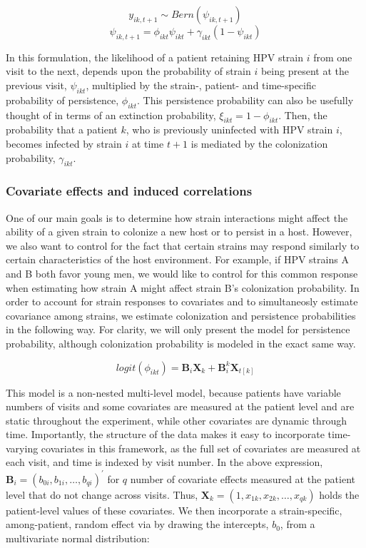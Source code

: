 \documentclass{article}
\begin{document}
$$y_{ik,t+1} \sim Bern(\psi_{ik,t+1})$$
$$\psi_{ik,t+1} = \phi_{ikt}\psi_{ikt} + \gamma_{ikt}(1-\psi_{ikt})$$

In this formulation, the likelihood of a patient retaining HPV strain $i$ from one visit to the next, depends upon the probability of strain $i$ being present at the previous visit, $\psi_{ikt}$, multiplied by the strain-, patient- and time-specific probability of persistence, $\phi_{ikt}$. This persistence probability can also be usefully thought of in terms of an extinction probability, $\xi_{ikt} = 1 - \phi_{ikt}$. Then, the probability that a patient $k$, who is previously uninfected with HPV strain $i$, becomes infected by strain $i$ at time $t+1$ is mediated by the colonization probability, $\gamma_{ikt}$.

\subsubsection*{Covariate effects and induced correlations}

One of our main goals is to determine how strain interactions might affect the ability of a given strain to colonize a new host or to persist in a host. However, we also want to control for the fact that certain strains may respond similarly to certain characteristics of the host environment. For example, if HPV strains A and B both favor young men, we would like to control for this common response when estimating how strain A might affect strain B's colonization probability. In order to account for strain responses to covariates and to simultaneosly estimate covariance among strains, we estimate colonization and persistence probabilities in the following way. For clarity, we will only present the model for persistence probability, although colonization probability is modeled in the exact same way. 

$$ logit(\phi_{ikt}) = \textbf{B}_{i}\textbf{X}_{k} + \textbf{B}^{k}_{i}\textbf{X}_{t[k]} $$

This model is a non-nested multi-level model, because patients have variable numbers of visits and some covariates are measured at the patient level and are static throughout the experiment, while other covariates are dynamic through time. Importantly, the structure of the data makes it easy to incorporate time-varying covariates in this framework, as the full set of covariates are measured at each visit, and time is indexed by visit number. In the above expression, $ \textbf{B}_{i} = (b_{0i}, b_{1i}, \dots, b_{qi})^{'} $ for $q$ number of covariate effects measured at the patient level that do not change across visits. Thus, $ \textbf{X}_{k} = (1, x_{1k}, x_{2k}, \dots, x_{qk}) $ holds the patient-level values of these covariates. We then incorporate a strain-specific, among-patient, random effect via by drawing the intercepts, $b_0$, from a multivariate normal distribution:
\end{document}
